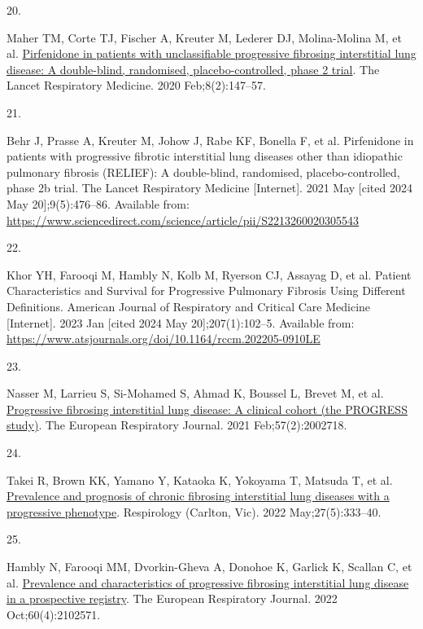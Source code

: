 \documentclass[
]{article}
\newlength{\cslhangindent}
\newlength{\csllabelwidth}
\newlength{\cslentryspacingunit} %
\newenvironment{CSLReferences}[2] %
 {%
  \setlength{\parindent}{0pt}
  \ifodd #1
  \let\oldpar\par
  \def\par{\hangindent=\cslhangindent\oldpar}
  \fi
  \setlength{\parskip}{#2\cslentryspacingunit}
 }%
 {}
\newcommand{\CSLLeftMargin}[1]{\parbox[t]{\csllabelwidth}{#1}}
\newcommand{\CSLRightInline}[1]{\parbox[t]{\linewidth - \csllabelwidth}{#1}\break}
\begin{document}
\begin{CSLReferences}{0}{0}
\leavevmode{}%
\CSLLeftMargin{20. }%
\CSLRightInline{Maher TM, Corte TJ, Fischer A, Kreuter M, Lederer DJ, Molina-Molina M, et al. \href{https://doi.org/10.1016/S2213-2600(19)30341-8}{Pirfenidone in patients with unclassifiable progressive fibrosing interstitial lung disease: A double-blind, randomised, placebo-controlled, phase 2 trial}. The Lancet Respiratory Medicine. 2020 Feb;8(2):147--57. }

\leavevmode{}%
\CSLLeftMargin{21. }%
\CSLRightInline{Behr J, Prasse A, Kreuter M, Johow J, Rabe KF, Bonella F, et al. Pirfenidone in patients with progressive fibrotic interstitial lung diseases other than idiopathic pulmonary fibrosis ({RELIEF}): A double-blind, randomised, placebo-controlled, phase 2b trial. The Lancet Respiratory Medicine {[}Internet{]}. 2021 May {[}cited 2024 May 20{]};9(5):476--86. Available from: \url{https://www.sciencedirect.com/science/article/pii/S2213260020305543}}

\leavevmode{}%
\CSLLeftMargin{22. }%
\CSLRightInline{Khor YH, Farooqi M, Hambly N, Kolb M, Ryerson CJ, Assayag D, et al. Patient {Characteristics} and {Survival} for {Progressive} {Pulmonary} {Fibrosis} {Using} {Different} {Definitions}. American Journal of Respiratory and Critical Care Medicine {[}Internet{]}. 2023 Jan {[}cited 2024 May 20{]};207(1):102--5. Available from: \url{https://www.atsjournals.org/doi/10.1164/rccm.202205-0910LE}}

\leavevmode{}%
\CSLLeftMargin{23. }%
\CSLRightInline{Nasser M, Larrieu S, Si-Mohamed S, Ahmad K, Boussel L, Brevet M, et al. \href{https://doi.org/10.1183/13993003.02718-2020}{Progressive fibrosing interstitial lung disease: A clinical cohort (the {PROGRESS} study)}. The European Respiratory Journal. 2021 Feb;57(2):2002718. }

\leavevmode{}%
\CSLLeftMargin{24. }%
\CSLRightInline{Takei R, Brown KK, Yamano Y, Kataoka K, Yokoyama T, Matsuda T, et al. \href{https://doi.org/10.1111/resp.14245}{Prevalence and prognosis of chronic fibrosing interstitial lung diseases with a progressive phenotype}. Respirology (Carlton, Vic). 2022 May;27(5):333--40. }

\leavevmode{}%
\CSLLeftMargin{25. }%
\CSLRightInline{Hambly N, Farooqi MM, Dvorkin-Gheva A, Donohoe K, Garlick K, Scallan C, et al. \href{https://doi.org/10.1183/13993003.02571-2021}{Prevalence and characteristics of progressive fibrosing interstitial lung disease in a prospective registry}. The European Respiratory Journal. 2022 Oct;60(4):2102571. }


\end{CSLReferences}
\end{document}
